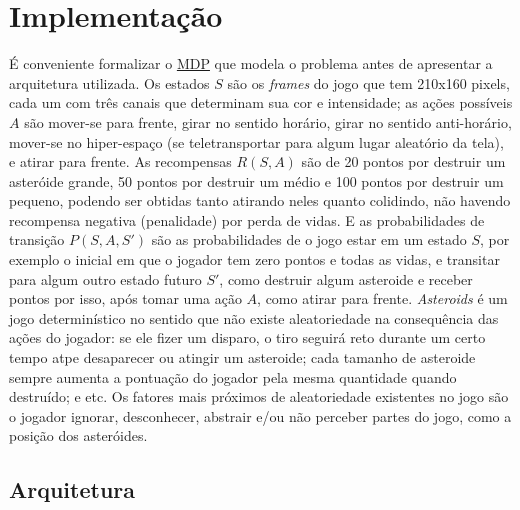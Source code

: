 


\chapter{Implementação}
\label{cap:implementacao}


É conveniente formalizar o \hyperref[sec:mdp]{MDP} que modela o problema antes de apresentar a arquitetura utilizada.
Os estados $S$ são os \textit{frames} do jogo que tem 210x160 pixels, cada um com três canais que determinam sua cor e intensidade;
as ações possíveis $A$ são mover-se para frente, girar no sentido horário, girar no sentido anti-horário, mover-se no hiper-espaço (se teletransportar para algum lugar aleatório da tela), e atirar para frente.
As recompensas $R(S,A)$ são de 20 pontos por destruir um asteróide grande, 50 pontos por destruir um médio e 100 pontos por destruir um pequeno, podendo ser obtidas tanto atirando neles quanto colidindo, não havendo recompensa negativa (penalidade) por perda de vidas.
E as probabilidades de transição $P(S,A,S')$ são as probabilidades de o jogo estar em um estado $S$, por exemplo o inicial em que o jogador tem zero pontos e todas as vidas, e transitar para algum outro estado futuro $S'$, como destruir algum asteroide e receber pontos por isso, após tomar uma ação $A$, como atirar para frente.
\textit{Asteroids} é um jogo determinístico no sentido que não existe aleatoriedade na consequência das ações do jogador: se ele fizer um disparo, o tiro seguirá reto durante um certo tempo atpe desaparecer ou atingir um asteroide; cada tamanho de asteroide sempre aumenta a pontuação do jogador pela mesma quantidade quando destruído; e etc.
Os fatores mais próximos de aleatoriedade existentes no jogo são o jogador ignorar, desconhecer, abstrair e/ou não perceber partes do jogo, como a posição dos asteróides.


\section{Arquitetura}
\label{sec:arq}

